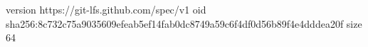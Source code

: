 version https://git-lfs.github.com/spec/v1
oid sha256:8c732c75a9035609efeab5ef14fab0dc8749a59c6f4df0d56b89f4e4dddea20f
size 64
